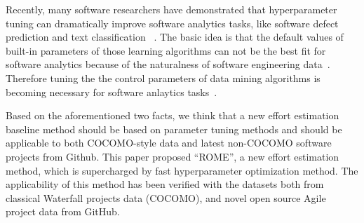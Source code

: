 \documentclass[sigconf,review]{acmart}
\begin{document}





Recently, many software researchers have demonstrated that hyperparameter tuning can dramatically improve software analytics tasks, like software defect prediction and text classification ~\cite{agrawal2017better,AGRAWAL2018,Fu2016TuningFS,tanti18,xia2018hyperparameter, fu2017easy}. The basic idea is that the default values of built-in parameters of those learning algorithms can not be the best fit for software analytics because of the naturalness of software engineering data~\cite{fu2016differential, hindle2012naturalness}. Therefore tuning the the control parameters of data
mining algorithms is becoming necessary for software anlaytics tasks~\cite{Fu2016TuningFS,tanti18}.


Based on the aforementioned two facts, we think that a new effort estimation baseline method should be based on parameter tuning methods and should be applicable to both COCOMO-style data and latest non-COCOMO software projects from Github. This paper proposed ``ROME'', a new effort estimation method, which is supercharged by fast hyperparameter optimization method. The applicability of this method has been verified  with the datasets both from classical Waterfall projects data (COCOMO), and novel open source Agile project data from GitHub. 
\end{document}
